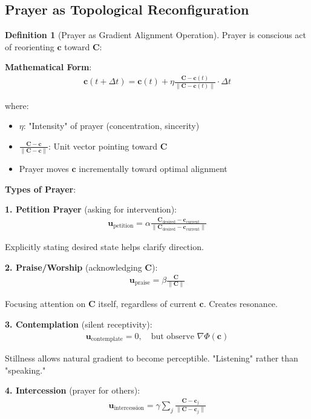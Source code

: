 \documentclass[11pt,a4paper]{article}
\theoremstyle{definition}
\newtheorem{definition}{Definition}[section]
\theoremstyle{remark}
\newcommand{\cc}{\mathbf{c}}
\begin{document}
\begin{enumerate}
\begin{protocol}
\subsection{Prayer as Topological Reconfiguration}

\begin{definition}[Prayer as Gradient Alignment Operation]
Prayer is conscious act of reorienting \(\cc\) toward \(\mathbf{C}\):

\textbf{Mathematical Form}:
\begin{align}
\cc(t + \Delta t) = \cc(t) + \eta \frac{\mathbf{C} - \cc(t)}{\|\mathbf{C} - \cc(t)\|} \cdot \Delta t
\end{align}

where:
\begin{itemize}
    \item \(\eta\): "Intensity" of prayer (concentration, sincerity)
    \item \(\frac{\mathbf{C} - \cc}{\|\mathbf{C} - \cc\|}\): Unit vector pointing toward \(\mathbf{C}\)
    \item Prayer moves \(\cc\) incrementally toward optimal alignment
\end{itemize}

\textbf{Types of Prayer}:

\textbf{1. Petition Prayer} (asking for intervention):
\begin{align}
\mathbf{u}_{\text{petition}} = \alpha \frac{\mathbf{C}_{\text{desired}} - \cc_{\text{current}}}{\|\mathbf{C}_{\text{desired}} - \cc_{\text{current}}\|}
\end{align}

Explicitly stating desired state helps clarify direction.

\textbf{2. Praise/Worship} (acknowledging \(\mathbf{C}\)):
\begin{align}
\mathbf{u}_{\text{praise}} = \beta \frac{\mathbf{C}}{\|\mathbf{C}\|}
\end{align}

Focusing attention on \(\mathbf{C}\) itself, regardless of current \(\cc\). Creates resonance.

\textbf{3. Contemplation} (silent receptivity):
\begin{align}
\mathbf{u}_{\text{contemplate}} = 0, \quad \text{but observe } \nabla \Phi(\cc)
\end{align}

Stillness allows natural gradient to become perceptible. "Listening" rather than "speaking."

\textbf{4. Intercession} (prayer for others):
\begin{align}
\mathbf{u}_{\text{intercession}} = \gamma \sum_j \frac{\mathbf{C} - \cc_j}{\|\mathbf{C} - \cc_j\|}
\end{align}


\end{definition}
\end{protocol}
\end{enumerate}
\end{document}
